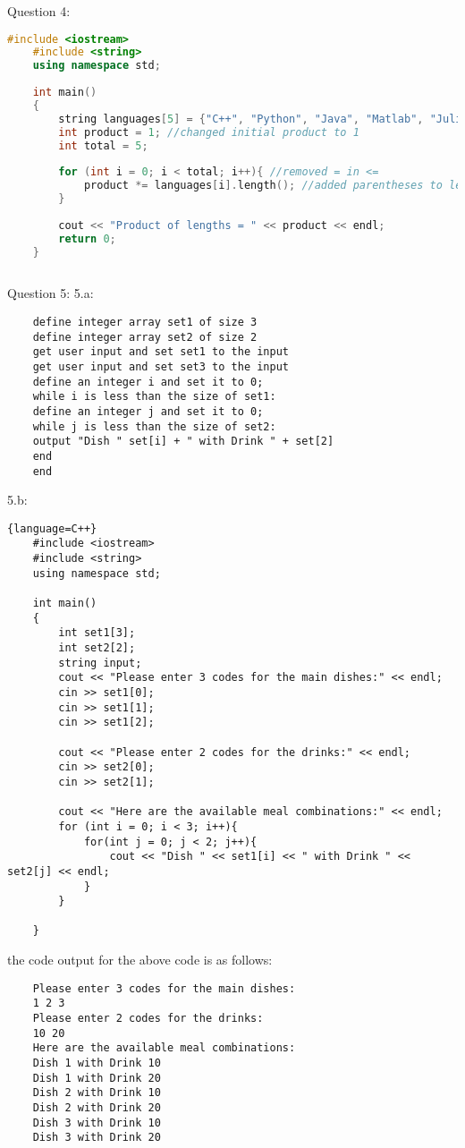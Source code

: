 \documentclass{article}
\begin{document}
\vspace{1cm}

Question 4:

\begin{lstlisting}[language=C++]
    #include <iostream>
    #include <string>
    using namespace std;
    
    int main()
    {
        string languages[5] = {"C++", "Python", "Java", "Matlab", "Julia"}; //changed the array length to 5
        int product = 1; //changed initial product to 1
        int total = 5;
    
        for (int i = 0; i < total; i++){ //removed = in <=
            product *= languages[i].length(); //added parentheses to length 
        }
    
        cout << "Product of lengths = " << product << endl;
        return 0;
    }
    
\end{lstlisting}

\vspace{1cm}

Question 5:
\hspace{0.25cm}5.a:
\begin{verbatim}
    define integer array set1 of size 3
    define integer array set2 of size 2
    get user input and set set1 to the input
    get user input and set set3 to the input
    define an integer i and set it to 0;
    while i is less than the size of set1:
    define an integer j and set it to 0;
    while j is less than the size of set2:
    output "Dish " set[i] + " with Drink " + set[2]
    end
    end
\end{verbatim}

\hspace{0.25cm}5.b:
\begin{lstlisting}{language=C++}
    #include <iostream>
    #include <string>
    using namespace std;
    
    int main()
    {
        int set1[3];
        int set2[2];
        string input;
        cout << "Please enter 3 codes for the main dishes:" << endl;
        cin >> set1[0];
        cin >> set1[1];
        cin >> set1[2];
    
        cout << "Please enter 2 codes for the drinks:" << endl;
        cin >> set2[0];
        cin >> set2[1];
    
        cout << "Here are the available meal combinations:" << endl;
        for (int i = 0; i < 3; i++){
            for(int j = 0; j < 2; j++){
                cout << "Dish " << set1[i] << " with Drink " << set2[j] << endl;
            }
        }
    
    }
\end{lstlisting}

the code output for the above code is as follows:

\begin{verbatim}
    Please enter 3 codes for the main dishes:
    1 2 3
    Please enter 2 codes for the drinks:
    10 20
    Here are the available meal combinations:
    Dish 1 with Drink 10
    Dish 1 with Drink 20
    Dish 2 with Drink 10
    Dish 2 with Drink 20
    Dish 3 with Drink 10
    Dish 3 with Drink 20
\end{verbatim}
\end{document}

